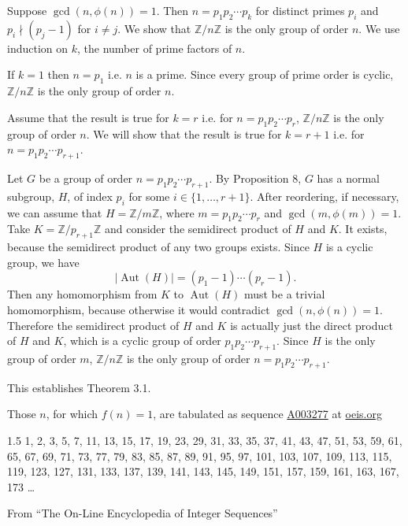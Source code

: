 \documentclass[12pt,reqno]{amsart}
\theoremstyle{plain}
\theoremstyle{definition}
\numberwithin{equation}{section}
\begin{document}
Suppose $\operatorname{gcd}(n,\phi(n))=1$. Then $n=p_1 p_2 \cdots p_k$ for distinct primes $p_i$ and $p_i \nmid (p_j-1)$ for $i\ne j$. We show that $\mathbb{Z}/n\mathbb{Z}$ is the only group of order $n$. We use induction on $k$, the number of prime factors of $n$.

If $k=1$ then $n=p_1$ i.e. $n$ is a prime. Since every group of prime order is cyclic, $\mathbb{Z}/n\mathbb{Z}$ is the only group of order $n$.

Assume that the result is true for $k=r$ i.e. for $n=p_1 p_2 \cdots p_r$, $\mathbb{Z}/n\mathbb{Z}$ is the only group of order $n$. We will show that the result is true for $k=r+1$ i.e. for $n=p_1 p_2 \cdots p_{r+1}$. 

Let $G$ be a group of order $n=p_1 p_2 \cdots p_{r+1}$.
By Proposition 8, $G$ has a normal subgroup, $H$, of index $p_i$ for some $i \in \{1,\dots,r+1\}$. After reordering, if necessary, we can assume that $H=\mathbb{Z}/m\mathbb{Z}$, where $m=p_1 p_2 \cdots p_r$ and $\operatorname{gcd}(m,\phi(m))=1$. Take $K=\mathbb{Z}/p_{r+1}\mathbb{Z}$ and consider the semidirect product of $H$ and $K$. It exists, because the semidirect product of any two groups exists. Since $H$ is a cyclic group, we have \[|\operatorname{Aut}(H)|=(p_1-1)\cdots(p_r-1).\] Then any homomorphism from $K$ to $\operatorname{Aut}(H)$ must be a trivial homomorphism, because otherwise it would contradict $\operatorname{gcd}(n,\phi(n))=1$. Therefore the semidirect product of $H$ and $K$ is actually just the direct product of $H$ and $K$, which is a cyclic group of order $p_1 p_2 \cdots p_{r+1}$. Since $H$ is the only group of order $m$, $\mathbb{Z}/n\mathbb{Z}$ is the only group of order $n=p_1 p_2 \cdots p_{r+1}$.

This establishes Theorem 3.1.

\medskip
Those $n$, for which $f(n)=1$, are tabulated as sequence \href{http://oeis.org/A003277}{A003277} at \href{http://oeis.org}{oeis.org}

\medskip
\begin{center}
\begin{minipage}{10cm}
\begin{spacing}{1.5}
    1, 2, 3, 5, 7, 11, 13, 15, 17, 19, 23, 29, 31, 33, 35, 37, 41, 43, 47, 51, 53, 59, 61, 65, 67, 69, 71, 73, 77, 79, 83, 85, 87, 89, 91, 95, 97, 101, 103, 107, 109, 113, 115, 119, 123, 127, 131, 133, 137, 139, 141, 143, 145, 149, 151, 157, 159, 161, 163, 167, 173 \ldots
\end{spacing}
\end{minipage}

    \vskip -3mm
    
    {\small \color{gray}  From ``The On-Line Encyclopedia of Integer Sequences''}
\end{center}
\end{document}
